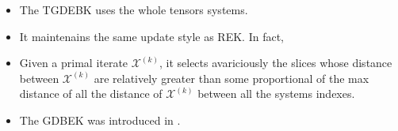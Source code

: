 \documentclass[aspectratio=169]{beamer}
\def\fm#1{\mathcal{#1}}
\def\fm#1{\mathcal{#1}}
\begin{document}
\begin{frame}{}
\begin{itemize}
    \item  The TGDEBK uses the whole tensors systems.
    \item It maintenains the same update style as  REK. In fact,
    \item Given a primal iterate $\mathcal{X}^{(k)}$, it selects avariciously the  slices whose distance between $\mathcal{X}^{(k)}$ are relatively greater than some proportional of the max distance of all the distance of $\fm X^{(k)}$ between all the systems indexes. 
    \item The GDBEK was introduced in \cite{an2024randomized}. 
\end{itemize}
\end{frame}
\end{document}
